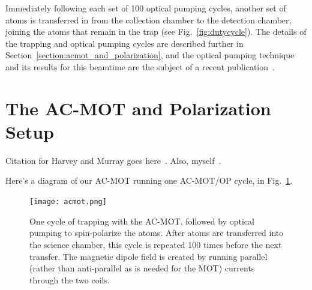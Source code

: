 Immediately following each set of 100 optical pumping cycles, another set of atoms is transferred in from the collection chamber to the detection chamber, joining the atoms that remain in the trap (see Fig.~\ref{fig:dutycycle}).  The details of the trapping and optical pumping cycles are described further in Section~\ref{section:acmot_and_polarization}, and the optical pumping technique and its results for this beamtime are the subject of a recent publication~\cite{ben_OP}.



\section{The AC-MOT and Polarization Setup}
\label{sec:acmot}
\label{section:acmot_and_polarization}



Citation for Harvey and Murray goes here~\cite{harveymurray}.  Also, myself~\cite{thesis}.

Here's a diagram of our AC-MOT running one AC-MOT/OP cycle, in Fig.~\ref{fig:acmot}.

\begin{figure}[ht]
	\centering
		\texttt{[image: acmot.png]}
		\caption{One cycle of trapping with the AC-MOT, followed by optical pumping to spin-polarize the atoms.  After atoms are transferred into the science chamber, this cycle is repeated 100 times before the next transfer.  The magnetic dipole field is created by running parallel (rather than anti-parallel as is needed for the MOT) currents through the two coils.}
		\label{fig:acmot}
\end{figure}


